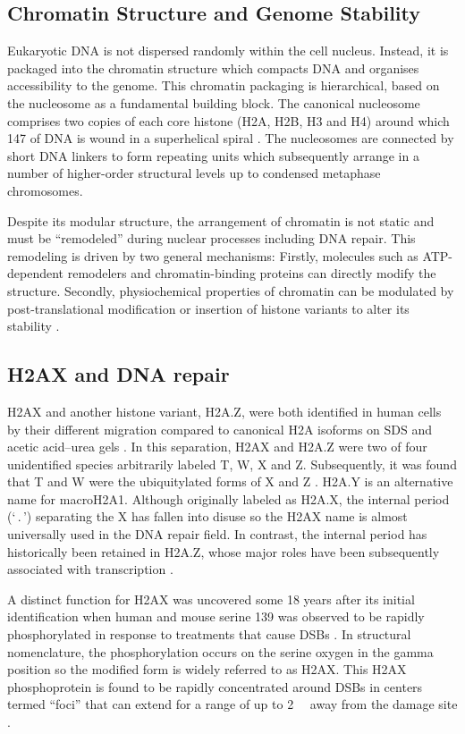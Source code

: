 \subsection{Chromatin Structure and Genome Stability}
Eukaryotic DNA is not dispersed randomly within the cell
nucleus. Instead, it is packaged into the chromatin structure which
compacts DNA and organises accessibility to the genome. This chromatin
packaging is hierarchical, based on the nucleosome as a fundamental
building block. The canonical nucleosome comprises two copies of each
core histone (H2A, H2B, H3 and H4) around which \SI{147}{\bp} of DNA is
wound in a superhelical spiral \citep{richmond-1kx5-19ansgtrom}. The nucleosomes are
connected by short DNA linkers to form repeating units which
subsequently arrange in a number of higher-order structural levels up
to condensed metaphase chromosomes.

Despite its modular structure, the arrangement of chromatin is not
static and must be ``remodeled'' during nuclear processes including
DNA repair. This remodeling is driven by two general mechanisms:
Firstly, molecules such as ATP-dependent remodelers and
chromatin-binding proteins can directly modify the
structure. Secondly, physiochemical properties of chromatin can be
modulated by post-translational modification or insertion of histone
variants to alter its stability \citep{controlling-double-helix,JA06}.

\subsection{H2AX and DNA repair}
H2AX and another histone variant, H2A.Z, were both identified in human
cells by their different migration compared to canonical H2A isoforms
on SDS and acetic acid--urea gels \citep{MHPW80}. In this separation,
H2AX and H2A.Z were two of four unidentified species arbitrarily
labeled T, W, X and Z\@. Subsequently, it was found that T and W were
the ubiquitylated forms of X and Z \citep{MHPW80}.
H2A.Y is an alternative name for macroH2A1. Although originally
labeled as H2A.X, the internal period (`\,.\,') separating the X has
fallen into disuse so the H2AX name is almost universally used in the
DNA repair field. In contrast, the internal period has historically
been retained in H2A.Z, whose major roles have been subsequently
associated with transcription \citep{JA06}.

A distinct function for H2AX was uncovered some 18 years after its
initial identification when human and mouse serine 139 was observed to
be rapidly phosphorylated in response to treatments that cause DSBs
\citep{EPR+98}. In structural nomenclature, the phosphorylation occurs
on the serine oxygen in the gamma position so the modified form is
widely referred to as \textgamma H2AX\@. This \textgamma H2AX
phosphoprotein is found to be rapidly concentrated around DSBs in
centers termed ``foci'' that can extend for a range of up to
\SI{2}{\mega\bp} away from the damage site \citep{EPR+99}.

